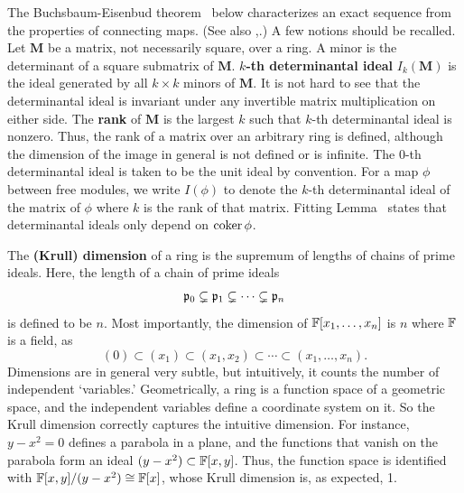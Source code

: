 The Buchsbaum-Eisenbud theorem~\cite{BuchsbaumEisenbud1973Exact}
below characterizes an exact sequence
from the properties of connecting maps.
(See also \cite[Theorem~20.9, Proposition~18.2]{Eisenbud},\cite[Chapter~6 Theorem~15]{Northcott}.)
A few notions should be recalled.
Let $\mathbf M$ be a matrix, not necessarily square, over a ring.
A minor is the determinant of a square submatrix of $\mathbf M$.
{\bf $k$-th determinantal ideal} $I_k(\mathbf M)$ is the ideal generated by all $k \times k$ minors of $\mathbf M$.
It is not hard to see that the determinantal ideal is invariant under any invertible
matrix multiplication on either side. 
The {\bf rank} of $\mathbf M$ is the largest $k$ such that $k$-th determinantal ideal is nonzero.
Thus, the rank of a matrix over an arbitrary ring is defined,
although the dimension of the image in general is not defined or is infinite.
The $0$-th determinantal ideal is taken to be the unit ideal by convention.
For a map $\phi$ between free modules,
we write $I(\phi)$ to denote the $k$-th determinantal
ideal of the matrix of $\phi$ where $k$ is the rank of that matrix.
Fitting Lemma~\cite[Corollary-Definition~20.4]{Eisenbud}
states that determinantal ideals only depend on $\mathop{\mathrm{coker}}\nolimits \phi$.



The {\bf (Krull) dimension} of a ring is the supremum of lengths of chains of prime ideals.
Here, the length of a chain of prime ideals
\[
 \mathfrak{p}_0 \subsetneq \mathfrak{p}_1 \subsetneq \cdots \subsetneq \mathfrak{p}_n
\]
is defined to be $n$.
Most importantly, the dimension of $\mathbb{F}[x_1,\ldots,x_n]$ is $n$ where $\mathbb{F}$ is a field, as
\[
 (0) \subset (x_1) \subset (x_1,x_2) \subset \cdots \subset (x_1,\ldots,x_n) .
\]
Dimensions are in general very subtle,
but intuitively, it counts the number of independent `variables.'
Geometrically, a ring is a function space of a geometric space,
and the independent variables define a coordinate system on it.
So the Krull dimension correctly captures the intuitive dimension.
For instance, $y-x^2=0$ defines a parabola in a plane,
and the functions that vanish on the parabola form an ideal $(y-x^2) \subset \mathbb{F}[x,y]$.
Thus, the function space is identified with $\mathbb{F}[x,y]/(y-x^2) \cong \mathbb{F}[x]$,
whose Krull dimension is, as expected, 1.


